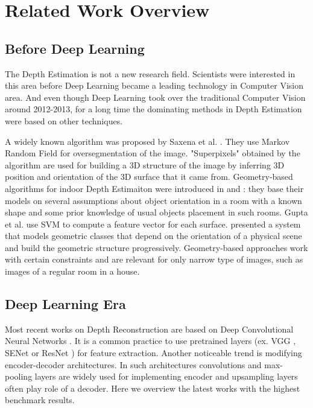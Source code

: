\documentclass[10pt,twocolumn,letterpaper]{article}
\begin{document}
\section{Related Work Overview}

\subsection{Before Deep Learning}

The Depth Estimation is not a new research field. Scientists were interested
in this area before Deep Learning became a leading technology in Computer Vision
area. And even though Deep Learning took over the traditional Computer Vision
around 2012-2013, for a long time the dominating methods in Depth Estimation were based
on other techniques.

A widely known algorithm was proposed by Saxena et al. \cite{saxena2009make3d}. They use Markov Random Field for oversegmentation of the image. "Superpixels" obtained by the algorithm are used for building a 3D structure of the image by inferring 3D  position and orientation of the 3D surface that it came from. Geometry-based algorithms for indoor Depth Estimaiton were introduced in \cite{hedau2010thinking} and \cite{gupta2010estimating}: they base their models on several assumptions about object orientation in a room with a known shape and some prior knowledge of usual objects placement in such rooms. Gupta et al. use SVM to compute a feature vector for each surface.  \cite{hoiem2005geometric} presented a system that models geometric classes that depend on the orientation of a physical scene and build the geometric structure progressively. Geometry-based approaches work with certain constraints and are relevant for only narrow type of images, such as images of a regular room in a house.



\subsection{Deep Learning Era}

Most recent works on Depth Reconstruction are based on Deep Convolutional Neural Networks \cite{eigen2015predicting, krizhevsky2012imagenet, kuznietsov2017semi, laina2016deeper, liu2016learning}. It is a common practice to use pretrained layers (ex. VGG \cite{simonyan2014very}, SENet \cite{hu2017squeeze} or ResNet \cite{he2016deep}) for feature extraction. Another noticeable trend is modifying encoder-decoder architectures. In such architectures convolutions and max-pooling layers are widely used for implementing encoder and upsampling layers often play role of a decoder.
Here we overview the latest works with the highest benchmark results.
\end{document}
